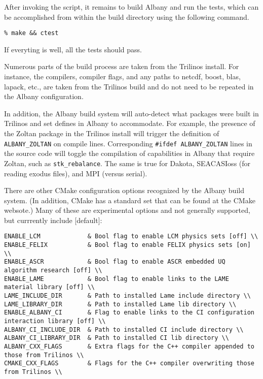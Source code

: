 \documentclass[pdf,12pt,report,strict]{SANDreport}
\theoremstyle{remark}
\begin{document}
After invoking the script, it remains to build Albany and run the
tests, which can be accomplished from within the build directory using
the following command.
\begin{verbatim}
% make && ctest
\end{verbatim}
If everyting is well, all the tests should pass. 

Numerous parts of the build process are taken from the Trilinos install.
For instance, the compilers, compiler flags, and any paths to netcdf,
boost, blas, lapack, etc., are taken from the Trilinos build and do not
need to be repeated in the Albany configuration.

In addition, the Albany build system will auto-detect what packages 
were built in Trilinos and set defines in Albany to accommodate.
For example, the presence of the Zoltan package in the Trilinos install
will trigger the definition of \texttt{ALBANY\_ZOLTAN}  on compile lines. 
Corresponding \texttt{\#ifdef ALBANY\_ZOLTAN} lines in the source code
will toggle the compilation of capabilities in Albany that require
Zoltan, such as \texttt{stk\_rebalance}. The same is true for Dakota,
SEACASIoss (for reading exodus files), and MPI (versus serial).

There are other CMake configuration options recognized by the
Albany build system. (In addition, CMake has a standard set that
can be found at the CMake websote.) Many of these are experimental
options and not generally supported, but currrently include [default]:
\begin{verbatim}
ENABLE_LCM             & Bool flag to enable LCM physics sets [off] \\
ENABLE_FELIX           & Bool flag to enable FELIX physics sets [on] \\
ENABLE_ASCR            & Bool flag to enable ASCR embedded UQ algorithm research [off] \\
ENABLE_LAME            & Bool flag to enable links to the LAME material library [off] \\
LAME_INCLUDE_DIR       & Path to installed Lame include directory \\
LAME_LIBRARY_DIR       & Path to installed Lame lib directory \\
ENABLE_ALBANY_CI       & Flag to enable links to the CI configuration interaction library [off] \\
ALBANY_CI_INCLUDE_DIR  & Path to installed CI include directory \\
ALBANY_CI_LIBRARY_DIR  & Path to installed CI lib directory \\
ALBANY_CXX_FLAGS       & Extra flags for the C++ compiler appended to those from Trilinos \\
CMAKE_CXX_FLAGS        & Flags for the C++ compiler overwriting those from Trilinos \\
\end{verbatim}
\end{document}
